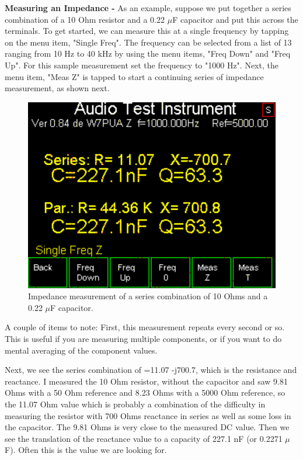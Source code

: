 \textbf{Measuring an Impedance - }As an example, suppose we put together a series combination of a 10 Ohm resistor and a 0.22 $\mu$F capacitor and put this across the  terminals. To get started, we can measure this at a single frequency by tapping on the menu item, "\textsf{Single Freq}". The frequency can be selected from a list of 13 ranging from 10 Hz to 40 kHz by using the menu items, "\textsf{Freq Down}" and "\textsf{Freq Up}".  For this sample measurement set the frequency to "1000 Hz".  Next, the menu item, "\textsf{Meas Z}" is tapped to start a continuing series of impedance measurement, as shown next.
\begin{figure}[H]
\begin{center}
\includegraphics[scale=0.75]{./images/AVNA_006.pdf}
\caption{Impedance measurement of a series combination of 10 Ohms and a 0.22 $\mu$F capacitor.}
\label{AVNA_006-label}
\end{center}
\end{figure}
A couple of items to note:  First, this measurement repeats every second or so.
This is useful if you are measuring multiple components, or if you want to do mental averaging of the component values.

Next, we see the series combination of  =11.07 -j700.7, which is the resistance and reactance. I measured the 10 Ohm resistor, without the capacitor and saw 9.81 Ohms with a 50 Ohm reference and 8.23 Ohms with a 5000 Ohm reference, so the 11.07 Ohm value which is probably a combination of the difficulty in measuring the resistor with 700 Ohms reactance in series as well as some loss in the capacitor.  The 9.81 Ohms is very close to the measured DC value. Then we see the translation of the reactance value to a capacity of 227.1 nF (or 0.2271 $\mu$F).  Often this is the value we are looking for.

